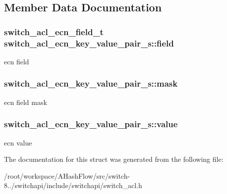 \subsection{Member Data Documentation}
\hypertarget{structswitch__acl__ecn__key__value__pair__s_af33291b2c30e006f127b2aac07257112}{
\subsubsection[{field}]{\setlength{\rightskip}{0pt plus 5cm}switch\+\_\+acl\+\_\+ecn\+\_\+field\+\_\+t switch\+\_\+acl\+\_\+ecn\+\_\+key\+\_\+value\+\_\+pair\+\_\+s\+::field}}\label{structswitch__acl__ecn__key__value__pair__s_af33291b2c30e006f127b2aac07257112}
ecn field \hypertarget{structswitch__acl__ecn__key__value__pair__s_aca9ed04bdcfa010885728826ff92e708}{
\subsubsection[{mask}]{ switch\+\_\+acl\+\_\+ecn\+\_\+key\+\_\+value\+\_\+pair\+\_\+s\+::mask}}\label{structswitch__acl__ecn__key__value__pair__s_aca9ed04bdcfa010885728826ff92e708}
ecn field mask \hypertarget{structswitch__acl__ecn__key__value__pair__s_a16709804093d6335e2015bbc9a0f3084}{
\subsubsection[{value}]{ switch\+\_\+acl\+\_\+ecn\+\_\+key\+\_\+value\+\_\+pair\+\_\+s\+::value}}\label{structswitch__acl__ecn__key__value__pair__s_a16709804093d6335e2015bbc9a0f3084}
ecn value 

The documentation for this struct was generated from the following file\+:\begin{DoxyCompactItemize}
\item 
/root/workspace/\+A\+Hash\+Flow/src/switch-\/8../switchapi/include/switchapi/switch\+\_\+acl.\+h\end{DoxyCompactItemize}
